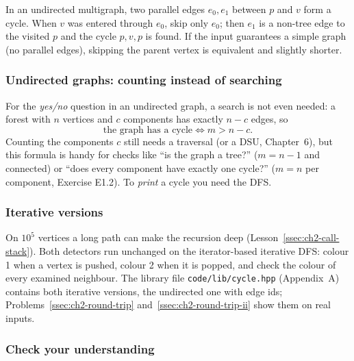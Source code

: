 \begin{warningbox}
In an undirected multigraph, two parallel edges $e_0, e_1$ between $p$ and $v$ form a cycle. When $v$ was entered through $e_0$, skip only $e_0$; then $e_1$ is a non-tree edge to the visited $p$ and the cycle $p, v, p$ is found. If the input guarantees a simple graph (no parallel edges), skipping the parent vertex is equivalent and slightly shorter.
\end{warningbox}

\subsubsection*{Undirected graphs: counting instead of searching}

For the \emph{yes/no} question in an undirected graph, a search is not even needed: a forest with $n$ vertices and $c$ components has exactly $n - c$ edges, so
\[
    \text{the graph has a cycle} \iff m > n - c.
\]
Counting the components $c$ still needs a traversal (or a DSU, Chapter~6), but this formula is handy for checks like ``is the graph a tree?'' ($m = n - 1$ and connected) or ``does every component have exactly one cycle?'' ($m = n$ per component, Exercise E1.2). To \emph{print} a cycle you need the DFS.

\subsubsection*{Iterative versions}

On $10^5$ vertices a long path can make the recursion deep (Lesson~\ref{ssec:ch2-call-stack}). Both detectors run unchanged on the iterator-based iterative DFS: colour 1 when a vertex is pushed, colour 2 when it is popped, and check the colour of every examined neighbour. The library file \texttt{code/lib/cycle.hpp} (Appendix~A) contains both iterative versions, the undirected one with edge ids; Problems~\ref{ssec:ch2-round-trip} and~\ref{ssec:ch2-round-trip-ii} show them on real inputs.

\subsubsection*{Check your understanding}

